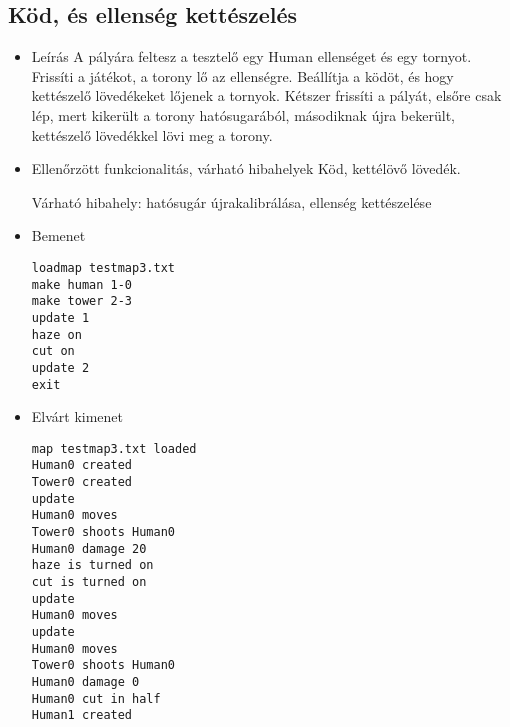\subsection{Köd, és ellenség kettészelés}
\begin{itemize}
\item Leírás\newline
A pályára feltesz a tesztelő egy Human ellenséget és egy tornyot. Frissíti a játékot, a torony lő az ellenségre. Beállítja a ködöt, és hogy kettészelő lövedékeket lőjenek a tornyok. Kétszer frissíti a pályát, elsőre csak lép, mert kikerült a torony hatósugarából, másodiknak újra bekerült, kettészelő lövedékkel lövi meg a torony.	
\item Ellenőrzött funkcionalitás, várható hibahelyek\newline
Köd, kettélövő lövedék.

Várható hibahely: hatósugár újrakalibrálása, ellenség kettészelése
\item Bemenet\newline
\begin{verbatim}
loadmap testmap3.txt
make human 1-0
make tower 2-3
update 1
haze on
cut on
update 2
exit
\end{verbatim}
\item Elvárt kimenet\newline
\begin{verbatim}
map testmap3.txt loaded
Human0 created
Tower0 created
update 
Human0 moves
Tower0 shoots Human0
Human0 damage 20
haze is turned on
cut is turned on
update
Human0 moves
update
Human0 moves
Tower0 shoots Human0
Human0 damage 0
Human0 cut in half
Human1 created
\end{verbatim}
\end{itemize}

